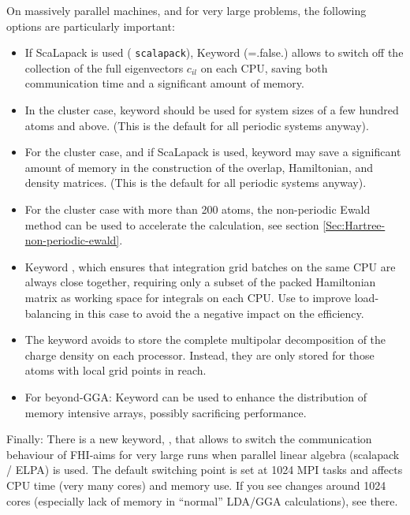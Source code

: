 On massively parallel machines, and for very large problems, the
following options are particularly important:
\begin{itemize}
  \item If ScaLapack is used (
    \texttt{scalapack}), Keyword 
    (=.false.) allows to switch off the collection of the full 
    eigenvectors $c_{il}$ on each CPU, saving both communication 
    time and a significant amount of memory.
  \item In the cluster case, keyword  
    should be used for system sizes of a few hundred atoms and
    above. (This is the default for all periodic systems anyway). 
  \item For the cluster case, and if ScaLapack is used, keyword
     may save a significant amount of
    memory in the construction of the overlap, Hamiltonian, and density
    matrices. (This is the default for all periodic systems anyway).
  \item For the cluster case with more than 200 atoms, the non-periodic
    Ewald method can be used to accelerate the calculation, see
    section \ref{Sec:Hartree-non-periodic-ewald}.
  \item Keyword , which ensures that integration
    grid batches on the same CPU are always close together, requiring only a
    subset of the packed Hamiltonian matrix as working space for integrals on
    each CPU. Use  to improve load-balancing in this
    case to avoid the a negative impact on the efficiency.
  \item The keyword  avoids to store the
    complete multipolar decomposition of the charge density on each processor.
    Instead, they are only stored for those atoms with local grid points in
    reach.
  \item For beyond-GGA: Keyword  can be used to enhance
    the distribution of memory intensive arrays, possibly sacrificing
    performance.
\end{itemize}

Finally: There is a new keyword, , that allows
to switch the communication behaviour of FHI-aims for very large runs
when parallel linear algebra (scalapack / ELPA) is used. The default
switching point is set at 1024 MPI tasks and affects CPU time (very
many cores) and memory use. If you see changes around 1024 cores
(especially lack of memory in ``normal'' LDA/GGA calculations), see
there. 

